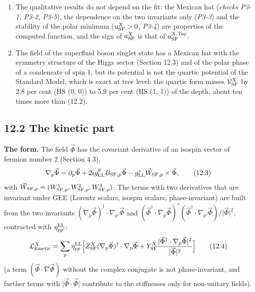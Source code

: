 \documentclass[
  10pt,
]{article}
\begin{document}
\begin{enumerate}
  physical: \(\Phi^X_{0,{\rm SF}}\), the depth, the curvatures
  \(\mathcal V''_{\rm amp}\) and \(\mathcal V''_{\rm NU}\), and the
  Taylor coefficient \(a^{X,{\rm Tay}}_{\rm SF}\) at the origin. No
  physical meaning may be given to \(b^X_{\rm SF}\) or \(c^X_{\rm SF}\)
  alone, and the methods may be compared through these coefficients only
  within the accuracy of the fit.
\item
  The qualitative results do not depend on the fit: the Mexican hat
  (\emph{checks P3-1, P3-2, P3-5}), the dependence on the two invariants
  only (\emph{P3-3}) and the stability of the polar minimum
  (\(u^X_{\rm SF}>0\), \emph{P3-4}) are properties of the computed
  function, and the sign of \(a^X_{\rm SF}\) is that of
  \(a^{X,{\rm Tay}}_{\rm SF}\).
\item
  The field of the superfluid boson singlet state has a Mexican hat with
  the symmetry structure of the Higgs sector (Section 12.3) and of the
  polar phase of a condensate of spin 1, but its potential is not the
  quartic potential of the Standard Model, which is exact at tree level:
  the quartic form misses \(\mathcal V^X_{\rm SF}\) by \(2.8\) per cent
  (HS (0, 0)) to \(5.9\) per cent (HS (1, 1)) of the depth, about ten
  times more than (12.2).
\end{enumerate}

\hypertarget{the-kinetic-part}{%
\subsection{12.2 The kinetic part}\label{the-kinetic-part}}

\textbf{The form.} The field \(\vec\Phi\) has the covariant derivative
of an isospin vector of fermion number 2 (Section 4.3),
\[\nabla_p\vec\Phi=\partial_p\vec\Phi+2ig^{\rm F}_{\rm LL}B_{{\rm SF},p}\vec\Phi-g^{\rm v}_{\rm LL}\vec W_{{\rm SF},p}\times\vec\Phi,\tag{12.3}\]
with
\(\vec W_{{\rm SF},p}=(W^1_{{\rm SF},p},W^2_{{\rm SF},p},W^3_{{\rm SF},p})\).
The terms with two derivatives that are invariant under GEE (Lorentz
scalars, isospin scalars, phase-invariant) are built from the two
invariants \((\nabla_p\vec\Phi)^\dagger\cdot\nabla_{p'}\vec\Phi\) and
\((\vec\Phi^\dagger\cdot\nabla_p\vec\Phi)^*(\vec\Phi^\dagger\cdot\nabla_{p'}\vec\Phi)/\lvert\vec\Phi\rvert^2\),
contracted with \(\eta^{\rm LL}_{pp'}\):
\[\mathcal L^X_{\rm kinetic}=\sum_p\eta^{\rm LL}_{pp}\Big[Z^X_{\rm SF}(\nabla_p\vec\Phi)^\dagger\cdot\nabla_p\vec\Phi+Y^X_{\rm SF}\frac{\lvert\vec\Phi^\dagger\cdot\nabla_p\vec\Phi\rvert^2}{\lvert\vec\Phi\rvert^2}\Big]\tag{12.4}\]
(a term \((\vec\Phi\cdot\nabla\vec\Phi)\) without the complex conjugate
is not phase-invariant, and further terms with
\(\lvert\vec\Phi\cdot\vec\Phi\rvert\) contribute to the stiffnesses only
for non-unitary fields).
\end{document}
